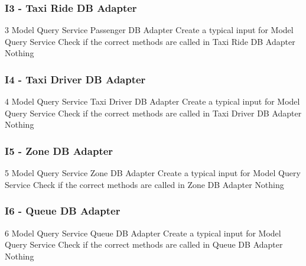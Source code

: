 \subsubsection{I3 - Taxi Ride DB Adapter}
\testCase
	{3}
	{Model Query Service}
	{Passenger DB Adapter}
	{Create a typical input for Model Query Service}
	{Check if the correct methods are called in Taxi Ride DB Adapter}
	{Nothing}
	{}
\subsubsection{I4 - Taxi Driver DB Adapter}
\testCase
	{4}
	{Model Query Service}
	{Taxi Driver DB Adapter}
	{Create a typical input for Model Query Service}
	{Check if the correct methods are called in Taxi Driver DB Adapter}
	{Nothing}
	{}
\subsubsection{I5 - Zone DB Adapter}
\testCase
	{5}
	{Model Query Service}
	{Zone DB Adapter}
	{Create a typical input for Model Query Service}
	{Check if the correct methods are called in Zone DB Adapter}
	{Nothing}
	{}
\subsubsection{I6 - Queue DB Adapter}
\testCase
	{6}
	{Model Query Service}
	{Queue DB Adapter}
	{Create a typical input for Model Query Service}
	{Check if the correct methods are called in Queue DB Adapter}
	{Nothing}
	{}